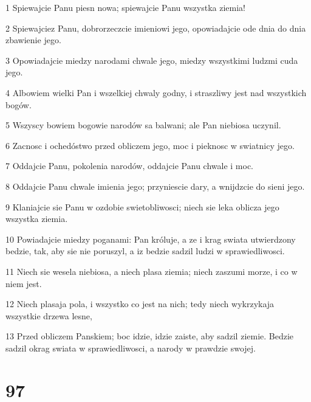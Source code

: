 \par 1 Spiewajcie Panu piesn nowa; spiewajcie Panu wszystka ziemia!
\par 2 Spiewajciez Panu, dobrorzeczcie imieniowi jego, opowiadajcie ode dnia do dnia zbawienie jego.
\par 3 Opowiadajcie miedzy narodami chwale jego, miedzy wszystkimi ludzmi cuda jego.
\par 4 Albowiem wielki Pan i wszelkiej chwaly godny, i straszliwy jest nad wszystkich bogów.
\par 5 Wszyscy bowiem bogowie narodów sa balwani; ale Pan niebiosa uczynil.
\par 6 Zacnosc i ochedóstwo przed obliczem jego, moc i pieknosc w swiatnicy jego.
\par 7 Oddajcie Panu, pokolenia narodów, oddajcie Panu chwale i moc.
\par 8 Oddajcie Panu chwale imienia jego; przyniescie dary, a wnijdzcie do sieni jego.
\par 9 Klaniajcie sie Panu w ozdobie swietobliwosci; niech sie leka oblicza jego wszystka ziemia.
\par 10 Powiadajcie miedzy poganami: Pan króluje, a ze i krag swiata utwierdzony bedzie, tak, aby sie nie poruszyl, a iz bedzie sadzil ludzi w sprawiedliwosci.
\par 11 Niech sie wesela niebiosa, a niech plasa ziemia; niech zaszumi morze, i co w niem jest.
\par 12 Niech plasaja pola, i wszystko co jest na nich; tedy niech wykrzykaja wszystkie drzewa lesne,
\par 13 Przed obliczem Panskiem; boc idzie, idzie zaiste, aby sadzil ziemie. Bedzie sadzil okrag swiata w sprawiedliwosci, a narody w prawdzie swojej.

\chapter{97}

